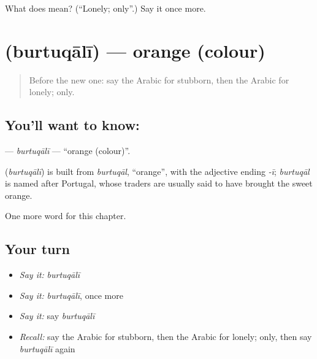 \begin{tcolorbox}[breakable,colback=teal!4,colframe=teal!35!black,title={Before you move on}]
What does  mean? (\textquotedblleft{}Lonely; only\textquotedblright{}.) Say it once more.
\end{tcolorbox}
\section[\texorpdfstring{\ar{برتقالي} (burtuqālī)}{برتقالي (burtuqālī)}]{ (burtuqālī) — orange (colour)}

\label{lesson:AR-C271-burtuqali}



\begin{quote}
Before the new one: say the Arabic for stubborn, then the Arabic for lonely; only.
\end{quote}

\subsection*{You'll want to know: }
\textbf{} — \emph{burtuqālī} — \textquotedblleft{}orange (colour)\textquotedblright{}.

\begin{cousinweb}
\textbf{} (\emph{burtuqālī}) is built from \emph{burtuqāl}, \textquotedblleft{}orange\textquotedblright{}, with the adjective ending \emph{-ī}; \emph{burtuqāl} is named after Portugal, whose traders are usually said to have brought the sweet orange.
\end{cousinweb}

\begin{grammarlens}[title={What you've built}]
One more word for this chapter.
\end{grammarlens}

\subsection*{Your turn}
\begin{itemize}
\raggedright
  \item \emph{Say it:} \emph{burtuqālī}
  \item \emph{Say it:} \emph{burtuqālī}, once more
  \item \emph{Say it:} say \emph{burtuqālī}
  \item \emph{Recall:} say the Arabic for stubborn, then the Arabic for lonely; only, then say \emph{burtuqālī} again
\end{itemize}

